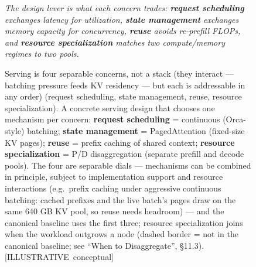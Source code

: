 \begin{figure}
\centering
{}
\caption[Serving is four separable concerns, not a stack]{Serving is four separable concerns, not a stack (they interact --- batching pressure feeds KV residency --- but each is addressable in any order) (request scheduling, state management, reuse, resource specialization). A concrete serving design that chooses one mechanism per concern: \textbf{request scheduling} = continuous (Orca-style) batching; \textbf{state management} = PagedAttention (fixed-size KV pages); \textbf{reuse} = prefix caching of shared context; \textbf{resource specialization} = P/D disaggregation (separate prefill and decode pools). The four are separable dials --- mechanisms can be combined in principle, subject to implementation support and resource interactions (e.g.~prefix caching under aggressive continuous batching: cached prefixes and the live batch's pages draw on the same 640 GB KV pool, so reuse needs headroom) --- and the canonical baseline uses the first three; resource specialization joins when the workload outgrows a node (dashed border = not in the canonical baseline; see ``When to Disaggregate'', §11.3). \mbox{{[}ILLUSTRATIVE conceptual{]}}}

\label{fig:11.2}\emph{The design lever is what each concern trades: \textbf{request
scheduling} exchanges latency for utilization, \textbf{state management}
exchanges memory capacity for concurrency, \textbf{reuse} avoids
re-prefill FLOPs, and \textbf{resource specialization} matches two
compute/memory regimes to two pools.}


\end{figure}
